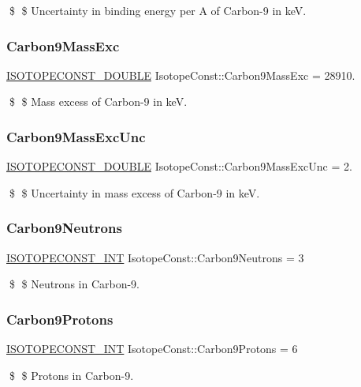 \$ \$ Uncertainty in binding energy per A of Carbon-\/9 in keV. \mbox{\label{group___isotope_const-_carbon-_c9_gab1692a19920785f50ffdf3cc7f0b74a8}} 
\subsubsection{\texorpdfstring{Carbon9\+Mass\+Exc}{Carbon9MassExc}}
{\footnotesize\ttfamily \mbox{\hyperlink{group___isotope_const-_macros_ga8f45a7272ce02c0b4c65c44636ed719a}{I\+S\+O\+T\+O\+P\+E\+C\+O\+N\+S\+T\+\_\+\+D\+O\+U\+B\+LE}} Isotope\+Const\+::\+Carbon9\+Mass\+Exc = 28910.}

\$ \$ Mass excess of Carbon-\/9 in keV. \mbox{\label{group___isotope_const-_carbon-_c9_ga147912d001a6ab929bc0d99f0368f4de}} 
\subsubsection{\texorpdfstring{Carbon9\+Mass\+Exc\+Unc}{Carbon9MassExcUnc}}
{\footnotesize\ttfamily \mbox{\hyperlink{group___isotope_const-_macros_ga8f45a7272ce02c0b4c65c44636ed719a}{I\+S\+O\+T\+O\+P\+E\+C\+O\+N\+S\+T\+\_\+\+D\+O\+U\+B\+LE}} Isotope\+Const\+::\+Carbon9\+Mass\+Exc\+Unc = 2.}

\$ \$ Uncertainty in mass excess of Carbon-\/9 in keV. \mbox{\label{group___isotope_const-_carbon-_c9_ga68b84554337af6d700447c4e2be9c167}} 
\subsubsection{\texorpdfstring{Carbon9\+Neutrons}{Carbon9Neutrons}}
{\footnotesize\ttfamily \mbox{\hyperlink{group___isotope_const-_macros_ga5f18360b3e99483a35c32d789e62621c}{I\+S\+O\+T\+O\+P\+E\+C\+O\+N\+S\+T\+\_\+\+I\+NT}} Isotope\+Const\+::\+Carbon9\+Neutrons = 3}

\$ \$ Neutrons in Carbon-\/9. \mbox{\label{group___isotope_const-_carbon-_c9_ga6a5f0225f423111762ac975a0634154b}} 
\subsubsection{\texorpdfstring{Carbon9\+Protons}{Carbon9Protons}}
{\footnotesize\ttfamily \mbox{\hyperlink{group___isotope_const-_macros_ga5f18360b3e99483a35c32d789e62621c}{I\+S\+O\+T\+O\+P\+E\+C\+O\+N\+S\+T\+\_\+\+I\+NT}} Isotope\+Const\+::\+Carbon9\+Protons = 6}

\$ \$ Protons in Carbon-\/9. 